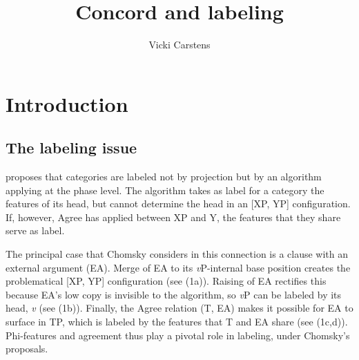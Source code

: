 \documentclass[output=paper
,modfonts
,nonflat]{langsci/langscibook}
\title{Concord and labeling}
\author{%
	Vicki Carstens\affiliation{Southern Illinois University}
}
\begin{document}
\maketitle
\section{Introduction} 
\subsection{The labeling issue}
\citet{Chomsky2013, Chomsky2015} proposes that categories are labeled not by projection but by an algorithm applying at the phase level. The algorithm takes as label for a category the features of its head, but cannot determine the head in an [XP, YP] configuration. If, however, Agree has applied between XP and Y, the features that they share serve as label. 

The principal case that Chomsky considers in this connection is a clause with an external argument (EA). Merge of EA to its \textit{v}P-internal base position creates the problematical [XP, YP] configuration (see (1a)). Raising of EA rectifies this because EA’s low copy is invisible to the algorithm, so \textit{v}P can be labeled by its head, \textit{v} (see (1b)). Finally, the Agree relation (T, EA) makes it possible for EA to surface in TP, which is labeled by the features that T and EA share (see (1c,d)). Phi-features and agreement thus play a pivotal role in labeling, under Chomsky's proposals. 
\end{document}
